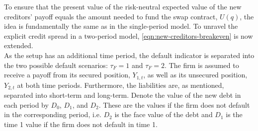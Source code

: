 \documentclass[main.tex]{subfiles}
\begin{document}
        To ensure that the present value of the risk-neutral expected value of the new creditors' payoff equals the amount needed to fund the swap contract, $U(q)$,
        the idea is fundamentally the same as in the single-period model.
        To unravel the explicit credit spread in a two-period model,
        \cref{eqn:new-creditors-breakeven} is now extended.
        \\
        As the setup has an additional time period, the default indicator is separated into the two possible default scenarios:
        $\tau_F = 1$ and $\tau_F = 2$.
        The firm is assumed to receive a payoff from its secured position, $Y_{1,t}$, 
        as well as its unsecured position, $Y_{2,t}$ at both time periods.
        Furthermore, the liabilities are, as mentioned, separated into short-term and long-term.
        Denote the value of the new debt in each period by $D_{0}$, $D_{1}$, and $D_{2}$.
        These are the values if the firm does not default in the corresponding period,
        i.e. $D_{2}$ is the face value of the debt and $D_{1}$ 
        is the time 1 value if the firm does not default in time 1.
\end{document}
